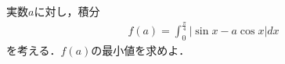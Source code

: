 \documentclass[../../main.tex]{subfiles}
\begin{document}
実数$a$に対し，積分
\begin{align}
  f(a)=\int_0^{\frac{\pi}{4}} |\sin x - a\cos x|dx
\end{align}
を考える．$f(a)$の最小値を求めよ．
\end{document}
